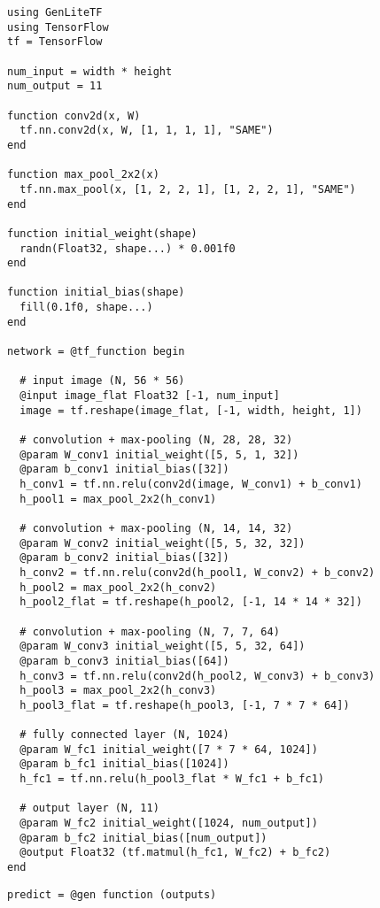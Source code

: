\begin{figure}[t]
\begin{minipage}[t]{0.6\textwidth}
\begin{lstlisting}
using GenLiteTF
using TensorFlow
tf = TensorFlow

num_input = width * height
num_output = 11

function conv2d(x, W)
  tf.nn.conv2d(x, W, [1, 1, 1, 1], "SAME")
end

function max_pool_2x2(x)
  tf.nn.max_pool(x, [1, 2, 2, 1], [1, 2, 2, 1], "SAME")
end

function initial_weight(shape)
  randn(Float32, shape...) * 0.001f0
end

function initial_bias(shape)
  fill(0.1f0, shape...)
end

network = @tf_function begin

  # input image (N, 56 * 56)
  @input image_flat Float32 [-1, num_input]
  image = tf.reshape(image_flat, [-1, width, height, 1])

  # convolution + max-pooling (N, 28, 28, 32)
  @param W_conv1 initial_weight([5, 5, 1, 32])
  @param b_conv1 initial_bias([32])
  h_conv1 = tf.nn.relu(conv2d(image, W_conv1) + b_conv1)
  h_pool1 = max_pool_2x2(h_conv1)

  # convolution + max-pooling (N, 14, 14, 32)
  @param W_conv2 initial_weight([5, 5, 32, 32])
  @param b_conv2 initial_bias([32])
  h_conv2 = tf.nn.relu(conv2d(h_pool1, W_conv2) + b_conv2)
  h_pool2 = max_pool_2x2(h_conv2)
  h_pool2_flat = tf.reshape(h_pool2, [-1, 14 * 14 * 32])

  # convolution + max-pooling (N, 7, 7, 64)
  @param W_conv3 initial_weight([5, 5, 32, 64])
  @param b_conv3 initial_bias([64])
  h_conv3 = tf.nn.relu(conv2d(h_pool2, W_conv3) + b_conv3)
  h_pool3 = max_pool_2x2(h_conv3)
  h_pool3_flat = tf.reshape(h_pool3, [-1, 7 * 7 * 64])

  # fully connected layer (N, 1024)
  @param W_fc1 initial_weight([7 * 7 * 64, 1024])
  @param b_fc1 initial_bias([1024])
  h_fc1 = tf.nn.relu(h_pool3_flat * W_fc1 + b_fc1)

  # output layer (N, 11)
  @param W_fc2 initial_weight([1024, num_output])
  @param b_fc2 initial_bias([num_output])
  @output Float32 (tf.matmul(h_fc1, W_fc2) + b_fc2)
end

\end{lstlisting}
\end{minipage}%
\begin{minipage}[t]{0.4\textwidth}
\begin{lstlisting}
predict = @gen function (outputs)


\end{lstlisting}
\end{minipage}
\end{figure}
